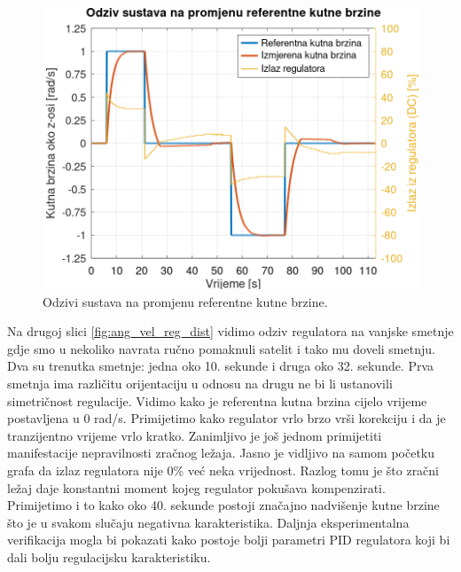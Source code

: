 \documentclass[times, utf8, diplomski, numeric]{templates/template}
\begin{document}
{{        \begin{figure}[htb]
        \centering
        \includegraphics[width=1.0\textwidth]{other/ang_vel_reg_user.png}
        \caption{Odzivi sustava na promjenu referentne kutne brzine.}
        \label{fig:ang_vel_reg_user}
        \end{figure}

        Na drugoj slici \ref{fig:ang_vel_reg_dist} vidimo odziv regulatora na vanjske smetnje gdje smo u nekoliko navrata ručno pomaknuli satelit i tako mu doveli smetnju. Dva su trenutka smetnje: jedna oko 10. sekunde i druga oko 32. sekunde. Prva smetnja ima različitu orijentaciju u odnosu na drugu ne bi li ustanovili simetričnost regulacije. Vidimo kako je referentna kutna brzina cijelo vrijeme postavljena u 0 rad/s. Primijetimo kako regulator vrlo brzo vrši korekciju i da je tranzijentno vrijeme vrlo kratko. Zanimljivo je još jednom primijetiti manifestacije nepravilnosti zračnog ležaja. Jasno je vidljivo na samom početku grafa da izlaz regulatora nije 0\% već neka vrijednost. Razlog tomu je što zračni ležaj daje konstantni moment kojeg regulator pokušava kompenzirati. Primijetimo i to kako oko 40. sekunde postoji značajno nadvišenje kutne brzine što je u svakom slučaju negativna karakteristika. Daljnja eksperimentalna verifikacija mogla bi pokazati kako postoje bolji parametri PID regulatora koji bi dali bolju regulacijsku karakteristiku.

}}
\end{document}
